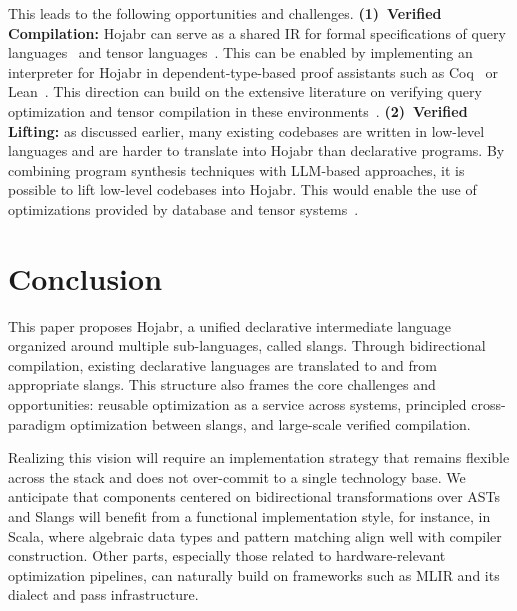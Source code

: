 \documentclass[sigconf,nonacm]{acmart}
\begin{document}
This leads to the following opportunities and challenges. \textbf{(1)~Verified Compilation:} Hojabr can serve as a shared IR for formal specifications of query languages~\cite{DBLP:conf/cidr/0001L24} and tensor languages~\cite{kovach2023indexed,liu2024verified}. This can be enabled by implementing an interpreter for Hojabr in dependent-type-based proof assistants such as Coq~\cite{barras1997coq} or Lean~\cite{de2015lean}. This direction can build on the extensive literature on verifying query optimization and tensor compilation in these environments~\cite{liu2022verified,DBLP:journals/pacmpl/AuerbachHMSS17,DBLP:conf/pldi/ChuWCS17}. 
\textbf{(2)~Verified Lifting:} as discussed earlier, many existing codebases are written in low-level languages and are harder to translate into Hojabr than declarative programs. By combining program synthesis techniques with LLM-based approaches, it is possible to lift low-level codebases into Hojabr. This would enable the use of optimizations provided by database and tensor systems~\cite{cheung2013optimizing, li2025guided}.

\section{Conclusion}
This paper proposes Hojabr, a unified declarative intermediate language organized around multiple sub-languages, called slangs. Through bidirectional compilation, existing declarative languages are translated to and from appropriate slangs. This structure also frames the core challenges and opportunities: reusable optimization as a service across systems, principled cross-paradigm optimization between slangs, and large-scale verified compilation. 

Realizing this vision will require an implementation strategy that remains flexible across the stack and does not over-commit to a single technology base. We anticipate that components centered on bidirectional transformations over ASTs and Slangs will benefit from a functional implementation style, for instance, in Scala, where algebraic data types and pattern matching align well with compiler construction. Other parts, especially those related to hardware-relevant optimization pipelines, can naturally build on frameworks such as MLIR and its dialect and pass infrastructure.

% 



\end{document}
